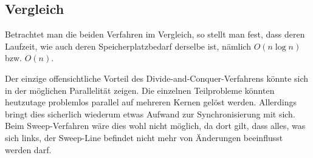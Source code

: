 \subsection{Vergleich}
\label{ssec:voronoiAlgorithmsComparison}

Betrachtet man die beiden Verfahren im Vergleich, so stellt man fest, dass deren Laufzeit, wie auch deren Speicherplatzbedarf derselbe ist, nämlich $O(n \log{n})$ bzw. $O(n)$.

Der einzige offensichtliche Vorteil des Divide-and-Conquer-Verfahrens könnte sich in der möglichen Parallelität zeigen. Die einzelnen Teilprobleme könnten heutzutage problemlos parallel auf mehreren Kernen gelöst werden. Allerdings bringt dies sicherlich wiederum etwas Aufwand zur Synchronisierung mit sich. Beim Sweep-Verfahren wäre dies wohl nicht möglich, da dort gilt, dass alles, was sich links, der Sweep-Line befindet nicht mehr von Änderungen beeinflusst werden darf.
